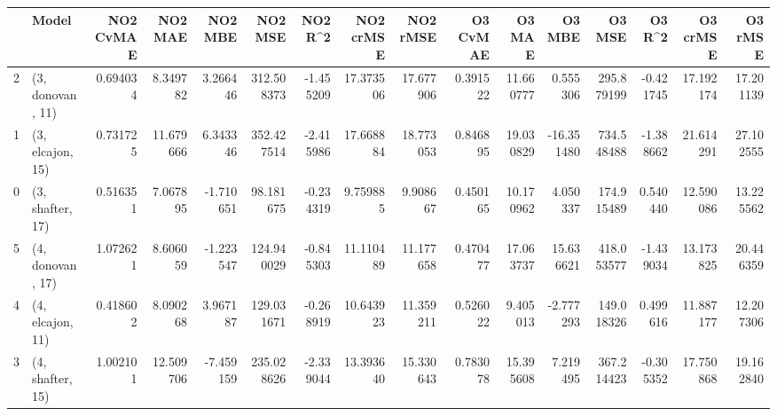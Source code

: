 \begin{tabular}{llrrrrrrrrrrrrrr}
\toprule
{} &             Model &  NO2 CvMAE &    NO2 MAE &   NO2 MBE &     NO2 MSE &   NO2 R\textasciicircum2 &  NO2 crMSE &   NO2 rMSE &  O3 CvMAE &     O3 MAE &     O3 MBE &      O3 MSE &    O3 R\textasciicircum2 &   O3 crMSE &    O3 rMSE \\
\midrule
2 &  (3, donovan, 11) &   0.694034 &   8.349782 &  3.266446 &  312.508373 & -1.455209 &  17.373506 &  17.677906 &  0.391522 &  11.660777 &   0.555306 &  295.879199 & -0.421745 &  17.192174 &  17.201139 \\
1 &  (3, elcajon, 15) &   0.731725 &  11.679666 &  6.343346 &  352.427514 & -2.415986 &  17.668884 &  18.773053 &  0.846895 &  19.030829 & -16.351480 &  734.548488 & -1.388662 &  21.614291 &  27.102555 \\
0 &  (3, shafter, 17) &   0.516351 &   7.067895 & -1.710651 &   98.181675 & -0.234319 &   9.759885 &   9.908667 &  0.450165 &  10.170962 &   4.050337 &  174.915489 &  0.540440 &  12.590086 &  13.225562 \\
5 &  (4, donovan, 17) &   1.072621 &   8.606059 & -1.223547 &  124.940029 & -0.845303 &  11.110489 &  11.177658 &  0.470477 &  17.063737 &  15.636621 &  418.053577 & -1.439034 &  13.173825 &  20.446359 \\
4 &  (4, elcajon, 11) &   0.418602 &   8.090268 &  3.967187 &  129.031671 & -0.268919 &  10.643923 &  11.359211 &  0.526022 &   9.405013 &  -2.777293 &  149.018326 &  0.499616 &  11.887177 &  12.207306 \\
3 &  (4, shafter, 15) &   1.002101 &  12.509706 & -7.459159 &  235.028626 & -2.339044 &  13.393640 &  15.330643 &  0.783078 &  15.395608 &   7.219495 &  367.214423 & -0.305352 &  17.750868 &  19.162840 \\
\bottomrule
\end{tabular}
